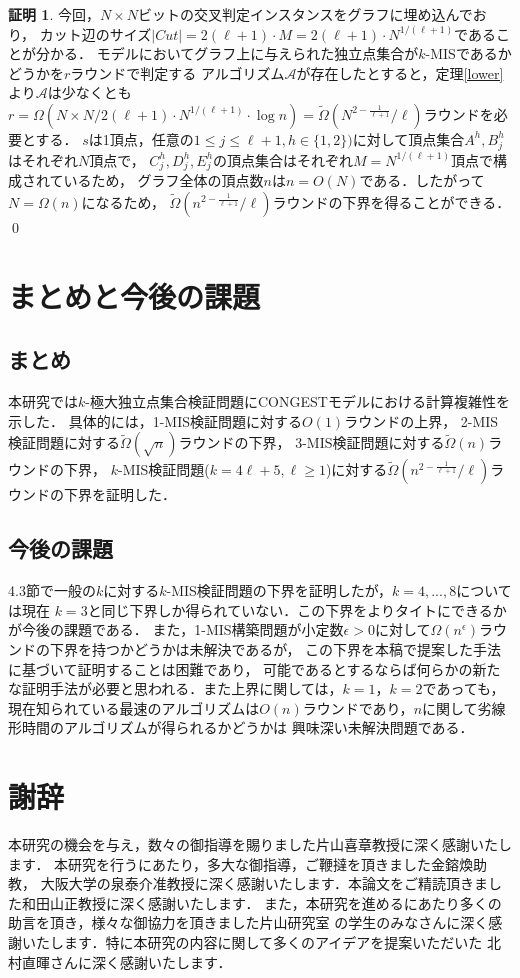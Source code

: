 \documentclass[12pt]{thesis}
\newcommand{\CONGEST}{\textsf{CONGEST}}
\theoremstyle{definition}
\newtheorem*{prf*}{証明}
\begin{document}
\begin{prf*}
今回，$N \times N$ビットの交叉判定インスタンスをグラフに埋め込んでおり，
カット辺のサイズ$|\mathit{Cut}| = 2(\ell + 1) \cdot M = 2(\ell + 1) \cdot N^{1/(\ell + 1)}$であることが分かる．
\sloppy{\CONGEST}モデルにおいてグラフ上に与えられた独立点集合が$k$-MISであるかどうかを$r$ラウンドで判定する
アルゴリズム$\mathcal{A}$が存在したとすると，定理\ref{lower}より$\mathcal{A}$は少なくとも
$r = \Omega \left(N \times N/2(\ell + 1) \cdot N^{1/(\ell + 1)} \cdot \log n\right)=\tilde{\Omega}\left(N^{2 - \frac{1}{\ell + 1}}/\ell \right)$ラウンドを必要とする．
$s$は1頂点，任意の$1\leq j \leq \ell+1, h \in \{1, 2\})$に対して頂点集合$A^{h}, B^{h}_{j}$はそれぞれ$N$頂点で，
$C^{h}_{j},D^{h}_{j},E^{h}_{j}$の頂点集合はそれぞれ$M=N^{1/(\ell + 1)}$頂点で構成されているため，
グラフ全体の頂点数$n$は$n = O(N)$である．したがって$N = \Omega(n)$になるため，
$\tilde{\Omega}\left(n^{2 - \frac{1}{\ell + 1}}/\ell \right)$ラウンドの下界を得ることができる． \qed
\end{prf*}
\newpage

\chapter{まとめと今後の課題}
\section{まとめ}
本研究では$k$-極大独立点集合検証問題に{\CONGEST}モデルにおける計算複雑性を示した．
具体的には，1-MIS検証問題に対する$O(1)$ラウンドの上界，
2-MIS検証問題に対する$\tilde{\Omega} (\sqrt{n})$ラウンドの下界，
3-MIS検証問題に対する$\tilde{\Omega} (n)$ラウンドの下界，
$k$-MIS検証問題($k = 4\ell + 5, \ell \geq 1$)に対する$\tilde{\Omega}\left(n^{2 - \frac{1}{\ell + 1}}/\ell \right)$ラウンドの下界を証明した．

\section{今後の課題}
4.3節で一般の$k$に対する$k$-MIS検証問題の下界を証明したが，$k = 4,...,8$については現在
$k=3$と同じ下界しか得られていない．この下界をよりタイトにできるかが今後の課題である．
また，1-MIS構築問題が小定数$\epsilon > 0$に対して$\Omega(n^{\epsilon})$ラウンドの下界を持つかどうかは未解決であるが，
この下界を本稿で提案した手法に基づいて証明することは困難であり，
可能であるとするならば何らかの新たな証明手法が必要と思われる．また上界に関しては，$k=1$，$k=2$であっても，
現在知られている最速のアルゴリズムは$O(n)$ラウンドであり，$n$に関して劣線形時間のアルゴリズムが得られるかどうかは
興味深い未解決問題である．
\newpage

\chapter*{謝辞}
本研究の機会を与え，数々の御指導を賜りました片山喜章教授に深く感謝いたします．
本研究を行うにあたり，多大な御指導，ご鞭撻を頂きました金鎔煥助教，
大阪大学の泉泰介准教授に深く感謝いたします．本論文をご精読頂きました和田山正教授に深く感謝いたします．
また，本研究を進めるにあたり多くの助言を頂き，様々な御協力を頂きました片山研究室
の学生のみなさんに深く感謝いたします．特に本研究の内容に関して多くのアイデアを提案いただいた
北村直暉さんに深く感謝いたします．

\newpage


\end{document}
